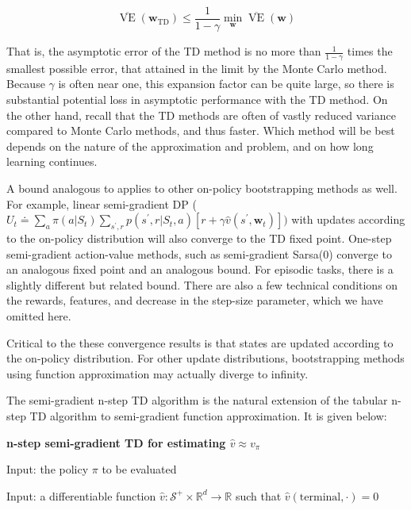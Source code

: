 \documentclass{article}
\begin{document}
$$
\overline { { \operatorname { V E } } } ( \mathbf { w } _ { \operatorname { T D } } ) \leq \frac { 1 } { 1 - \gamma } \operatorname* { m i n } _ { \mathbf { w } } \overline { { \operatorname { V E } } } ( \mathbf { w } )
$$

That is, the asymptotic error of the TD method is no more than $\frac { 1 } { 1   -   \gamma }$ times the smallest possible error, that attained in the limit by the Monte Carlo method. Because $\gamma$ is often near one, this expansion factor can be quite large, 
so there is substantial potential loss in asymptotic performance with the TD method. On the other hand, recall that the TD methods are often of vastly reduced variance compared to Monte Carlo methods, and thus faster. Which method will be best depends on 
the nature of the approximation and problem, and on how long learning continues.

A bound analogous to applies to other on-policy bootstrapping methods as well. For example, linear semi-gradient DP ($U _ { t } \doteq \sum _ { a } \pi ( a | S _ { t } ) \sum _ { s ^ { \prime } , r } p ( s ^ { \prime } , r | S _ { t } , a ) [ r + \gamma \hat { v } ( s ^ { \prime } \mathbf { , } \mathbf { w } _ { t } ) ] )$ 
with updates according to the on-policy distribution will also converge to the TD fixed point. One-step semi-gradient action-value methods, such as semi-gradient Sarsa(0) converge to an analogous fixed point and an analogous bound. For episodic tasks, there is a slightly different but related bound. There are also a few technical conditions on the rewards, features, and decrease in the step-size parameter, 
which we have omitted here.

Critical to the these convergence results is that states are updated according to the on-policy distribution. For other update distributions, bootstrapping methods using function approximation may actually diverge to infinity.

The semi-gradient n-step TD algorithm is the natural extension of the tabular n-step TD algorithm to semi-gradient function approximation. It is given below:

\textbf{n-step semi-gradient TD for estimating $\hat { v } \approx v _ { \pi }$}

Input: the policy $\pi$ to be evaluated

Input: a differentiable function $\hat { v } : \mathcal { S } ^ { + } \times \mathbb { R } ^ { d } \to \mathbb { R }$ such that $ \hat { v } ( \text{terminal}, \cdot ) = 0 $
\end{document}

